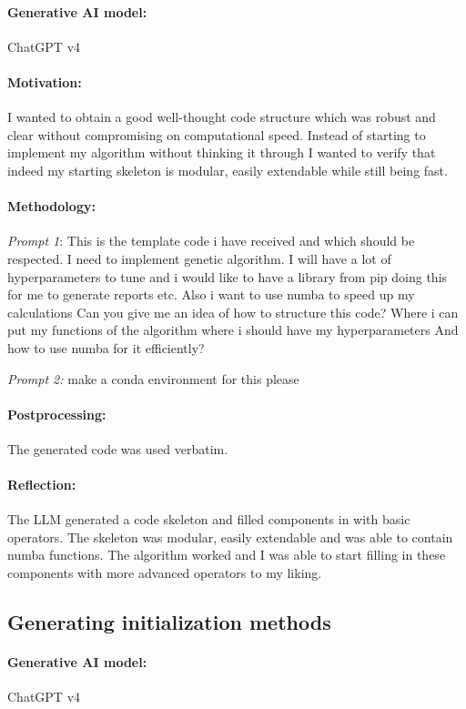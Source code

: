 \documentclass[a4paper,10pt]{article} %
\begin{document}
\paragraph{Generative AI model:} ChatGPT v4
\paragraph{Motivation:}
I wanted to obtain a good well-thought code structure which was robust and clear without compromising on computational speed. Instead of starting to implement my algorithm without thinking it through I wanted to verify that indeed my starting skeleton is modular, easily extendable while still being fast.

\paragraph{Methodology:} 
\textit{Prompt 1}: This is the template code i have received and which should be respected. I need to implement genetic algorithm. I will have a lot of hyperparameters to tune and i would like to have a library from pip doing this for me to generate reports etc. Also i want to use numba to speed up my calculations Can you give me an idea of how to structure this code? Where i can put my functions of the algorithm where i should have my hyperparameters And how to use numba for it efficiently?

\noindent
\textit{Prompt 2:} make a conda environment for this please

\paragraph{Postprocessing:} The generated code was used verbatim.

\paragraph{Reflection:} 
The LLM generated a code skeleton and filled components in with basic operators.
The skeleton was modular, easily extendable and was able to contain numba functions. The algorithm worked and I was able to start filling in these components with more advanced operators to my liking.

\subsection{Generating initialization methods} 
\paragraph{Generative AI model:} ChatGPT v4
\end{document}
